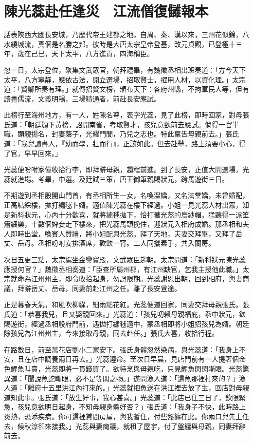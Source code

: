 
\chapter{陳光蕊赴任逢災　江流僧復讎報本}

話表陝西大國長安城，乃歷代帝王建都之地。自周、秦、漢以來，三州花似錦，八水繞城流，真個是名勝之邦。彼時是大唐太宗皇帝登基，改元貞觀，已登極十三年，歲在己巳，天下太平，八方進貢，四海稱臣。

忽一日，太宗登位，聚集文武眾官，朝拜禮畢，有魏徵丞相出班奏道：「方今天下太平，八方寧靜，應依古法，開立選場，招取賢士，擢用人材，以資化理。」太宗道：「賢卿所奏有理。」就傳招賢文榜，頒布天下：各府州縣，不拘軍民人等，但有讀書儒流，文義明暢，三場精通者，前赴長安應試。

此榜行至海州地方，有一人，姓陳名萼，表字光蕊，見了此榜，即時回家，對母張氏道：「朝廷頒下黃榜，詔開南省，考取賢才，孩兒意欲前去應試。倘得一官半職，顯親揚名，封妻蔭子，光耀門閭，乃兒之志也。特此稟告母親前去。」張氏道：「我兒讀書人，『幼而學，壯而行』，正該如此。但去赴舉，路上須要小心，得了官，早早回來。」

光蕊便吩咐家僮收拾行李，即拜辭母親，趲程前進。到了長安，正值大開選場，光蕊就進場。考畢，中選。及廷試三策，唐王御筆親賜狀元，跨馬遊街三日。

不期遊到丞相殷開山門首，有丞相所生一女，名喚溫嬌，又名滿堂嬌，未曾婚配，正高結綵樓，拋打繡毬卜婿。適值陳光蕊在樓下經過。小姐一見光蕊人材出眾，知是新科狀元，心內十分歡喜，就將繡毬拋下，恰打著光蕊的烏紗帽。猛聽得一派笙簫細樂，十數個婢妾走下樓來，把光蕊馬頭挽住，迎狀元入相府成婚。那丞相和夫人即時出堂，喚賓人贊禮，將小姐配與光蕊。拜了天地，夫妻交拜畢，又拜了岳丈、岳母。丞相吩咐安排酒席，歡飲一宵。二人同攜素手，共入蘭房。

次日五更三點，太宗駕坐金鑾寶殿，文武眾臣趨朝。太宗問道：「新科狀元陳光蕊應授何官？」魏徵丞相奏道：「臣查所屬州郡，有江州缺官，乞我主授他此職。」太宗就命為江州州主，即令收拾起身，勿誤限期。光蕊謝恩出朝，回到相府，與妻商議，拜辭岳丈、岳母，同妻前赴江州之任。離了長安登途。

正是暮春天氣，和風吹柳綠，細雨點花紅。光蕊便道回家，同妻交拜母親張氏。張氏道：「恭喜我兒，且又娶親回來。」光蕊道：「孩兒叨賴母親福庇，忝中狀元，欽賜遊街，經過丞相殷府門前，遇拋打繡毬適中，蒙丞相即將小姐招孩兒為婿。朝廷除孩兒為江州州主，今來接取母親，同去赴任。」張氏大喜，收拾行程。

在路數日，前至萬花店劉小二家安下。張氏身體忽然染病，與光蕊道：「我身上不安，且在店中調養兩日再去。」光蕊遵命。至次日早晨，見店門前有一人提著個金色鯉魚叫賣，光蕊即將一貫錢買了。欲待烹與母親吃，只見鯉魚閃閃䁪眼。光蕊驚異道：「聞說魚蛇䁪眼，必不是等閑之物。」遂問漁人道：「這魚那裡打來的？」漁人道：「離府十五里洪江內打來的。」光蕊就把魚送在洪江裡去放了生，回店對母親道知此事。張氏道：「放生好事，我心甚喜。」光蕊道：「此店已住三日了，欽限緊急，孩兒意欲明日起身，不知母親身體好否？」張氏道：「我身子不快，此時路上炎熱，恐添疾病。你可這裡賃間房屋，與我暫住，付些盤纏在此。你兩口兒先上任去，候秋涼卻來接我。」光蕊與妻商議，就租了屋宇，付了盤纏與母親，同妻拜辭前去。

